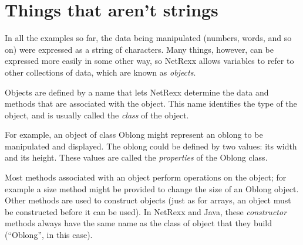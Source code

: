 \section{Things that aren’t strings}
In all the examples so far, the data being manipulated (numbers, words, and so on) were expressed as a string of characters. Many things, however, can be expressed more easily in some other way, so NetRexx allows variables to refer to other collections of data, which are known as \emph{objects}.

Objects are defined by a name that lets NetRexx determine the data and methods that are associated with the object. This name identifies the type of the object, and is usually called the \emph{class} of the object.

For example, an object of class Oblong might represent an oblong to be manipulated and displayed. The oblong could be defined by two values: its width and its height. These values are called the \emph{properties} of the Oblong class.

Most methods associated with an object perform operations on the object; for example a size method might be provided to change the size of an Oblong object. Other methods are used to construct objects (just as for arrays, an object must be constructed before it can be used). In NetRexx and Java, these \emph{constructor} methods always have the same name as the class of object that they build (“Oblong”, in this case).

